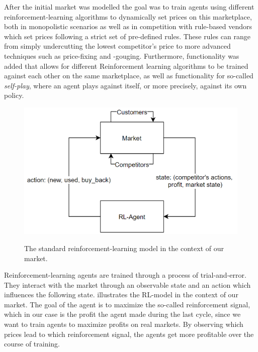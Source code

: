 After the initial market was modelled the goal was to train agents using different reinforcement-learning algorithms to dynamically set prices on this marketplace, both in monopolistic scenarios as well as in competition with rule-based vendors which set prices following a strict set of pre-defined rules. These rules can range from simply undercutting the lowest competitor's price to more advanced techniques such as price-fixing and -gouging. Furthermore, functionality was added that allows for different Reinforcement learning algorithms to be trained against each other on the same marketplace, as well as functionality for so-called \emph{self-play}, where an agent plays against itself, or more precisely, against its own policy.

\begin{figure}
	\centering
	\includegraphics[height = 7 cm]{images/RL-Overview.png}\\[1 ex]
	\caption{The standard reinforcement-learning model in the context of our market.}
	\label{fig:IntroRLDiagram}
\end{figure}

Reinforcement-learning agents are trained through a process of trial-and-error. They interact with the market through an observable state and an action which influences the following state.  illustrates the RL-model in the context of our market. The goal of the agent is to maximize the so-called reinforcement signal, which in our case is the profit the agent made during the last cycle, since we want to train agents to maximize profits on real markets. By observing which prices lead to which reinforcement signal, the agents get more profitable over the course of training.
